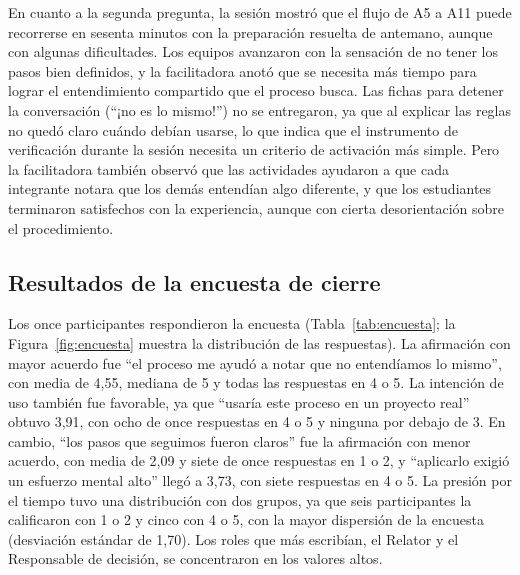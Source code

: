 \documentclass[12pt,letterpaper,oneside]{report}
\begin{document}
En cuanto a la segunda pregunta, la sesión mostró que el flujo de A5 a A11 puede
recorrerse en sesenta minutos con la preparación resuelta de antemano, aunque con algunas dificultades. Los equipos avanzaron con la sensación de no tener los
pasos bien definidos, y la facilitadora anotó que se necesita más tiempo para
lograr el entendimiento compartido que el proceso busca. Las fichas para
detener la conversación (``¡no es lo mismo!'') no se entregaron, ya que al
explicar las reglas no quedó claro cuándo debían usarse, lo que indica que el
instrumento de verificación durante la sesión necesita un criterio de
activación más simple. Pero la facilitadora también observó que las actividades ayudaron a que cada integrante notara
que los demás entendían algo diferente, y que los estudiantes terminaron
satisfechos con la experiencia, aunque con cierta desorientación sobre el
procedimiento.

\subsection{Resultados de la encuesta de cierre}
Los once participantes respondieron la encuesta (Tabla~\ref{tab:encuesta}; la
Figura~\ref{fig:encuesta} muestra la
distribución de las respuestas). La afirmación con mayor acuerdo fue ``el proceso me
ayudó a notar que no entendíamos lo mismo'', con media de 4,55, mediana de 5 y
todas las respuestas en 4 o 5. La intención de uso también fue favorable, ya que
``usaría este proceso en un proyecto real'' obtuvo 3,91, con ocho de once
respuestas en 4 o 5 y ninguna por debajo de 3. En cambio, ``los pasos que
seguimos fueron claros'' fue la afirmación con menor acuerdo, con media de 2,09
y siete de once respuestas en 1 o 2, y ``aplicarlo exigió un esfuerzo mental
alto'' llegó a 3,73, con siete respuestas en 4 o 5. La presión por el tiempo
tuvo una distribución con dos grupos, ya que seis participantes la calificaron
con 1 o 2 y cinco con 4 o 5, con la mayor dispersión de la encuesta (desviación estándar
de 1,70). Los roles que más escribían, el Relator y el Responsable de decisión,
se concentraron en los valores altos.
\end{document}
